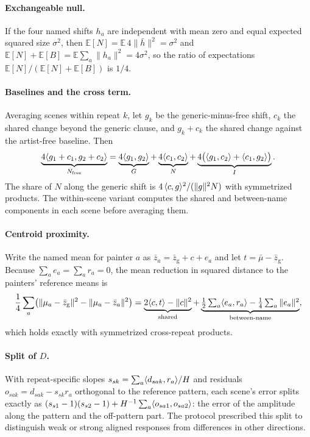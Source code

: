 \paragraph{Exchangeable null.} If the four named shifts $h_a$ are independent with mean zero and
equal expected squared size $\sigma^2$, then $\mathbb E[N]=\mathbb E\,4\|\bar h\|^2=\sigma^2$ and
$\mathbb E[N]+\mathbb E[B]=\mathbb E\sum_a\|h_a\|^2=4\sigma^2$, so the ratio of expectations
$\mathbb E[N]/(\mathbb E[N]+\mathbb E[B])$ is $1/4$.

\paragraph{Baselines and the cross term.} Averaging scenes within repeat $k$, let $g_k$ be the
generic-minus-free shift, $c_k$ the shared change beyond the generic clause, and $g_k+c_k$ the
shared change against the artist-free baseline. Then
\begin{equation}
\underbrace{4\langle g_1+c_1,g_2+c_2\rangle}_{N_{\mathrm{free}}}=\underbrace{4\langle g_1,g_2\rangle}_{G}
+\underbrace{4\langle c_1,c_2\rangle}_{N}
+\underbrace{4\bigl(\langle g_1,c_2\rangle+\langle c_1,g_2\rangle\bigr)}_{I}.
\end{equation}
The share of $N$ along the generic shift is $4\,\langle c,g\rangle^2/(\|g\|^2N)$ with symmetrized
products. The within-scene variant computes the shared and between-name components in each
scene before averaging them.

\paragraph{Centroid proximity.} Write the named mean for painter $a$ as $\bar z_a=\bar
z_{\mathrm{g}}+c+e_a$ and let $t=\bar\mu-\bar z_{\mathrm{g}}$. Because $\sum_ae_a=\sum_ar_a=0$,
the mean reduction in squared distance to the painters' reference means is
\begin{equation}
\frac14\sum_a\bigl(\|\mu_a-\bar z_{\mathrm{g}}\|^2-\|\mu_a-\bar z_a\|^2\bigr)
=\underbrace{2\langle c,t\rangle-\|c\|^2}_{\text{shared}}
+\underbrace{\tfrac12\textstyle\sum_a\langle e_a,r_a\rangle-\tfrac14\sum_a\|e_a\|^2}_{\text{between-name}},
\label{eq:centroid}
\end{equation}
which holds exactly with symmetrized cross-repeat products.

\paragraph{Split of $D$.} With repeat-specific slopes $s_{sk}=\sum_a\langle d_{sak},r_a\rangle/H$ and
residuals $o_{sak}=d_{sak}-s_{sk}r_a$ orthogonal to the reference pattern, each scene's error splits
exactly as $(s_{s1}-1)(s_{s2}-1)+H^{-1}\sum_a\langle o_{sa1},o_{sa2}\rangle$: the error of the amplitude along
the pattern and the off-pattern part. The protocol prescribed this split to distinguish weak or
strong aligned responses from differences in other directions.

